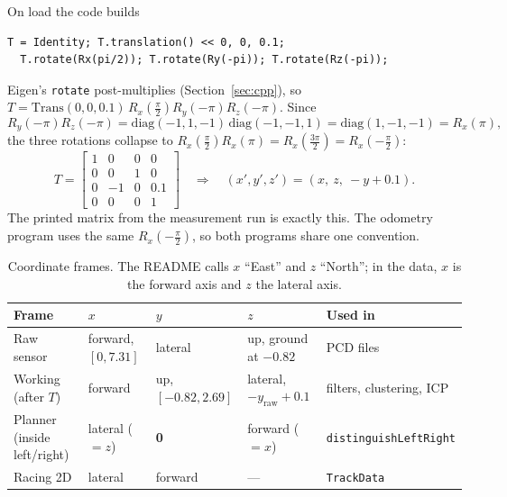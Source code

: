 \documentclass[10pt,a4paper]{scrartcl}
\renewcommand{\emph}[1]{\textcolor{accent}{#1}}
\newcommand{\code}[1]{\texttt{#1}}
\begin{document}
  On load the code builds
  \begin{lstlisting}[numbers=none]
  T = Identity; T.translation() << 0, 0, 0.1;
  T.rotate(Rx(pi/2)); T.rotate(Ry(-pi)); T.rotate(Rz(-pi));
  \end{lstlisting}
  Eigen's \code{rotate} \emph{post}-multiplies (Section~\ref{sec:cpp}), so
  $T=\mathrm{Trans}(0,0,0.1)\,R_x(\tfrac{\pi}{2})R_y(-\pi)R_z(-\pi)$. Since
  \begin{equation}
    R_y(-\pi)R_z(-\pi)=\mathrm{diag}(-1,1,-1)\,\mathrm{diag}(-1,-1,1)=\mathrm{diag}(1,-1,-1)=R_x(\pi),
  \end{equation}
  the three rotations collapse to $R_x(\tfrac{\pi}{2})R_x(\pi)=R_x(\tfrac{3\pi}{2})=R_x(-\tfrac{\pi}{2})$:
  \begin{equation}
    T=\begin{bmatrix}1&0&0&0\\0&0&1&0\\0&-1&0&0.1\\0&0&0&1\end{bmatrix}
    \quad\Longrightarrow\quad
    (x',y',z')=(x,\ z,\ -y+0.1).
  \end{equation}
  The printed matrix from the measurement run is exactly this. The odometry program
  uses the same $R_x(-\tfrac{\pi}{2})$, so both programs share one convention.

  \begin{table}[H]
  \small
  \centering
  \renewcommand{\arraystretch}{1.1}
  \begin{tabularx}{\textwidth}{@{}L{3.6cm} L{2.6cm} L{2.4cm} L{3.0cm} X@{}}
  \toprule
  \textbf{Frame} & \textbf{$x$} & \textbf{$y$} & \textbf{$z$} & \textbf{Used in} \\
  \midrule
  Raw sensor & forward, $[0,7.31]$ & lateral & up, ground at $-0.82$ & PCD files \\[.1cm]
  Working (after $T$) & forward & up, $[-0.82,2.69]$ & lateral, $-y_{\text{raw}}+0.1$ & filters, clustering, ICP \\[.1cm]
  Planner (inside left/right) & lateral ($=z$) & \textbf{0} & forward ($=x$) & \code{distinguishLeftRight} \\[.1cm]
  Racing 2D & lateral & forward & --- & \code{TrackData} \\
  \bottomrule
  \end{tabularx}
  \caption{Coordinate frames. The README calls $x$ ``East'' and $z$ ``North''; in the
  data, $x$ is the forward axis and $z$ the lateral axis.}
  \label{tab:frames}
  \end{table}
\end{document}
